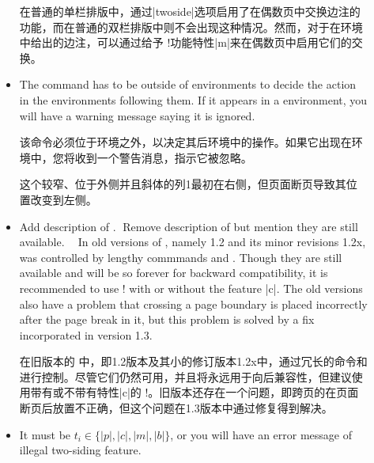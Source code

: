 \begin{description}
\begin{itemize}
在普通的单栏排版中，通过|twoside|选项启用了在偶数页中交换边注的功能，而在普通的双栏排版中则不会出现这种情况。然而，对于在环境中给出的边注，可以通过给予 \!\twosided!功能特性|m|来在偶数页中启用它们的交换。
\item\label{page:cswap}
The command has to be outside of  environments to decide the
action in the environments following them.  If it appears in a
 environment, you will have a warning message saying it is
ignored.

该命令必须位于环境之外，以决定其后环境中的操作。如果它出现在环境中，您将收到一个警告消息，指示它被忽略。
\twosided[c]

这个较窄、位于外侧并且斜体的列1最初在右侧，但页面断页导致其位置改变到左侧。
\item
{}
{Add description of .}
{Remove description of  but mention
    they are still available.}

In old versions of \Paracol, namely 1.2 and its minor revisions 1.2x,
\cswap{} was controlled by lengthy commmands
\Midx{\!\swapcolumninevenpages!} and \Midx{\!\noswapcolumninevenpages!}.
Though they are still available and will be so forever for backward
compatibility, it is recommended to use \!\twosided! with or without the
feature |c|.  The old versions also have a problem that \spanning{}
crossing a page boundary is placed incorrectly after the page break in it,
but this problem is solved by a fix incorporated in version 1.3.

在旧版本的 \Paracol 中，即1.2版本及其小的修订版本1.2x中，\cswap{}通过冗长的命令\Midx{\!\swapcolumninevenpages!}和\Midx{\!\noswapcolumninevenpages!}进行控制。尽管它们仍然可用，并且将永远用于向后兼容性，但建议使用带有或不带有特性|c|的 \!\twosided!。旧版本还存在一个问题，即跨页的\spanning{}在页面断页后放置不正确，但这个问题在1.3版本中通过修复得到解决。
\item
It must be $t_i\in\{|p|,|c|,|m|,|b|\}$, or you will have an error message
of illegal two-siding feature.


\end{itemize}
\end{description}
